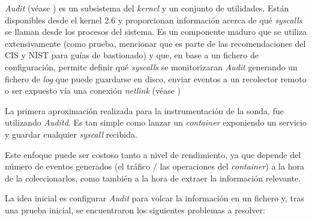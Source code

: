 \emph{Audit} (véase \cite{redhat-auditd}) es un subsistema del \emph{kernel} y un conjunto de utilidades. 
Están disponibles desde el kernel 2.6 y proporcionan información acerca de qué \emph{syscalls}
se llaman desde los procesos del sistema. 
Es un componente maduro que se utiliza extensivamente (como prueba, mencionar que es parte de las recomendaciones del CIS y NIST para guías de bastionado)
y que, en base a un fichero de configuración, permite definir qué \emph{syscalls} se monitorizaran
\emph{Audit} generando un fichero de \emph{log} que puede guardarse en disco, enviar eventos a un recolector remoto o ser expuesto vía una conexión
\emph{netlink} (véase \cite{wiki-netlink})

La primera aproximación realizada para la instrumentación de la sonda, fue utilizando \emph{Auditd}. Es tan simple como lanzar un \emph{container} exponiendo un servicio
y guardar cualquier \emph{syscall} recibida. 

Este enfoque puede ser costoso tanto a nivel de rendimiento, ya que depende del número de eventos generados (el tráfico / las operaciones del \emph{container}) a la hora de la coleccionarlos, como también
a la hora de extraer la información relevante.

La idea inicial es configurar \emph{Audit} para volcar la información en un fichero y, tras una prueba inicial, se encuentraron los siguientes problemas a resolver:

